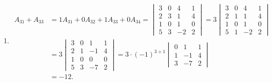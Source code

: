 \documentclass[UTF8,12pt,a4paper,fontset=fandol]{ctexart}
\begin{document}
\begin{solve}
\begin{enumerate}
                \item \begin{align*}
                            A_{31}+A_{33}
                            & = 1A_{31}+0A_{32}+1A_{33}+0A_{34}
                            = \begin{vmatrix}
                                3 & 0 & 4  & 1 \\
                                2 & 3 & 1  & 4 \\
                                1 & 0 & 1  & 0 \\
                                5 & 3 & -2 & 2
                            \end{vmatrix}
                            = 3 \begin{vmatrix}
                                    3 & 0 & 4  & 1 \\
                                    2 & 1 & 1  & 4 \\
                                    1 & 0 & 1  & 0 \\
                                    5 & 1 & -2 & 2
                                \end{vmatrix}                   \\
                            & = 3 \begin{vmatrix}
                                    3 & 0 & 1  & 1 \\
                                    2 & 1 & -1 & 4 \\
                                    1 & 0 & 0  & 0 \\
                                    5 & 3 & -7 & 2
                                \end{vmatrix}
                            = 3 \cdot (-1)^{3+1} \begin{vmatrix}
                                                    0 & 1  & 1 \\
                                                    1 & -1 & 4 \\
                                                    3 & -7 & 2
                                                \end{vmatrix}  \\
                            & = -12.
                        \end{align*}


\end{enumerate}
\end{solve}
\end{document}
